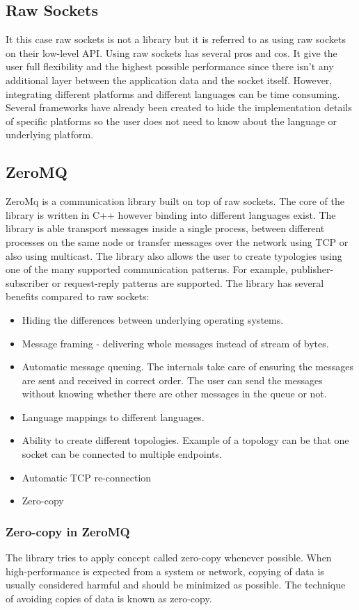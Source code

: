 \subsection{Raw Sockets}
\label{raw_sockets}
It this case raw sockets is not a library but it is referred to as using raw sockets on their low-level API. Using raw sockets has several pros and cos. It give the user full flexibility and the highest possible performance since there isn't any additional layer between the application data and the socket itself. However, integrating different platforms and different languages can be time consuming. Several frameworks have already been created to hide the implementation details of specific platforms so the user does not need to know about the language or underlying platform.
\subsection{ZeroMQ}
\label{zeromq}
ZeroMq is a communication library built on top of raw sockets. The core of the library is written in C++ however binding into different languages exist. The library is able transport messages inside a single process, between different processes on the same node or transfer messages over the network using TCP or also using multicast. The library also allows the user to create typologies using one of the many supported communication patterns. For example,  publisher-subscriber or request-reply patterns are supported. The library has several benefits compared to raw sockets:
\begin{itemize}
	\item Hiding the differences between underlying operating systems.
	\item Message framing - delivering whole messages instead of stream of bytes.
	\item Automatic message queuing. The internals take care of ensuring the messages are sent and received in correct order. The user can send the messages without knowing whether there are other messages in the queue or not.
	\item Language mappings to different languages.
	\item Ability to create different topologies. Example of a topology can be that one socket can be connected to multiple endpoints.
	\item Automatic TCP re-connection
	\item Zero-copy
\end{itemize}
\subsubsection{Zero-copy in ZeroMQ}
The library tries to apply concept called zero-copy whenever possible. When high-performance is expected from a system or network, copying of data is usually considered harmful and should be minimized as possible. The technique of avoiding copies of data is known as zero-copy.

